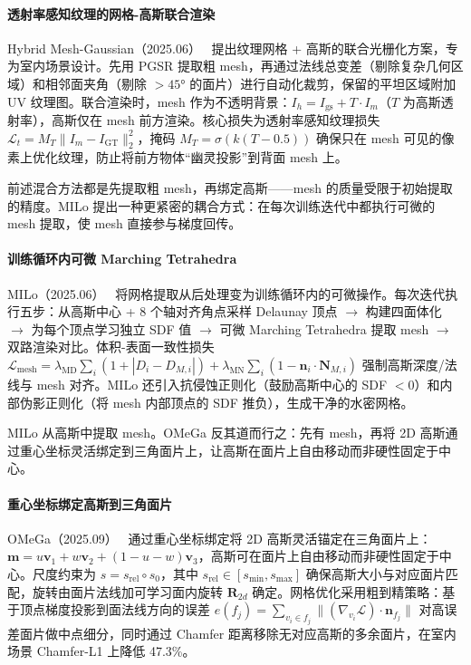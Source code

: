 \paragraph{透射率感知纹理的网格-高斯联合渲染}

Hybrid Mesh-Gaussian（2025.06）~\cite{2506_06988} 提出纹理网格 + 高斯的联合光栅化方案，专为室内场景设计。先用 PGSR 提取粗 mesh，再通过法线总变差（剔除复杂几何区域）和相邻面夹角（剔除 $>45°$ 的面片）进行自动化裁剪，保留的平坦区域附加 UV 纹理图。联合渲染时，mesh 作为不透明背景：$I_h = I_{\mathrm{gs}} + T \cdot I_m$（$T$ 为高斯透射率），高斯仅在 mesh 前方渲染。核心损失为透射率感知纹理损失 $\mathcal{L}_t = M_T \| I_m - I_{\mathrm{GT}}\|_2^2$，掩码 $M_T = \sigma(k(T - 0.5))$ 确保只在 mesh 可见的像素上优化纹理，防止将前方物体“幽灵投影”到背面 mesh 上。

前述混合方法都是先提取粗 mesh，再绑定高斯——mesh 的质量受限于初始提取的精度。MILo 提出一种更紧密的耦合方式：在每次训练迭代中都执行可微的 mesh 提取，使 mesh 直接参与梯度回传。

\paragraph{训练循环内可微 Marching Tetrahedra}

MILo（2025.06）~\cite{2506_24096} 将网格提取从后处理变为训练循环内的可微操作。每次迭代执行五步：从高斯中心 + 8 个轴对齐角点采样 Delaunay 顶点 $\to$ 构建四面体化 $\to$ 为每个顶点学习独立 SDF 值 $\to$ 可微 Marching Tetrahedra 提取 mesh $\to$ 双路渲染对比。体积-表面一致性损失 $\mathcal{L}_{\mathrm{mesh}} = \lambda_{\mathrm{MD}}\sum_i(1 + |D_i - D_{M,i}|) + \lambda_{\mathrm{MN}}\sum_i(1 - \mathbf{n}_i \cdot \mathbf{N}_{M,i})$ 强制高斯深度/法线与 mesh 对齐。MILo 还引入抗侵蚀正则化（鼓励高斯中心的 SDF $<0$）和内部伪影正则化（将 mesh 内部顶点的 SDF 推负），生成干净的水密网格。

MILo 从高斯中提取 mesh。OMeGa 反其道而行之：先有 mesh，再将 2D 高斯通过重心坐标灵活绑定到三角面片上，让高斯在面片上自由移动而非硬性固定于中心。

\paragraph{重心坐标绑定高斯到三角面片}

OMeGa（2025.09）~\cite{2509_24308} 通过重心坐标绑定将 2D 高斯灵活锚定在三角面片上：$\mathbf{m} = u\mathbf{v}_1 + w\mathbf{v}_2 + (1 - u - w)\mathbf{v}_3$，高斯可在面片上自由移动而非硬性固定于中心。尺度约束为 $s = s_{\mathrm{rel}} \circ s_0$，其中 $s_{\mathrm{rel}} \in [s_{\min}, s_{\max}]$ 确保高斯大小与对应面片匹配，旋转由面片法线加可学习面内旋转 $\mathbf{R}_{2d}$ 确定。网格优化采用粗到精策略：基于顶点梯度投影到面法线方向的误差 $e(f_j) = \sum_{v_i \in f_j}\|(\nabla_{v_i}\mathcal{L}) \cdot \mathbf{n}_{f_j}\|$ 对高误差面片做中点细分，同时通过 Chamfer 距离移除无对应高斯的多余面片，在室内场景 Chamfer-L1 上降低 47.3\%。

